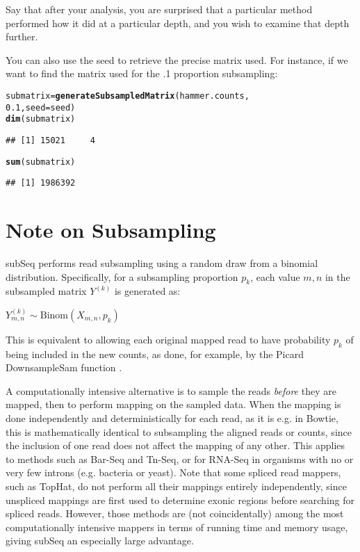 \documentclass{article}\usepackage[]{graphicx}\usepackage[]{color}
\makeatletter
\newcommand{\hlnum}[1]{\textcolor[rgb]{0.686,0.059,0.569}{#1}}%
\newcommand{\hlstd}[1]{\textcolor[rgb]{0.345,0.345,0.345}{#1}}%
\newcommand{\hlkwb}[1]{\textcolor[rgb]{0.69,0.353,0.396}{#1}}%
\newcommand{\hlkwc}[1]{\textcolor[rgb]{0.333,0.667,0.333}{#1}}%
\newcommand{\hlkwd}[1]{\textcolor[rgb]{0.737,0.353,0.396}{\textbf{#1}}}%
\newenvironment{kframe}{%
 \def\at@end@of@kframe{}%
 \ifinner\ifhmode%
  \def\at@end@of@kframe{\end{minipage}}%
  \begin{minipage}{\columnwidth}%
 \fi\fi%
 \def\FrameCommand##1{\hskip\@totalleftmargin \hskip-\fboxsep
 \colorbox{shadecolor}{##1}\hskip-\fboxsep
     \hskip-\linewidth \hskip-\@totalleftmargin \hskip\columnwidth}%
 \MakeFramed {\advance\hsize-\width
   \@totalleftmargin\z@ \linewidth\hsize
   \@setminipage}}%
 {\par\unskip\endMakeFramed%
 \at@end@of@kframe}
\newenvironment{knitrout}{}{} %
\makeatother
\begin{document}
Say that after your analysis, you are surprised that a particular method performed how it did at a particular depth, and you wish to examine that depth further.

You can also use the seed to retrieve the precise matrix used. For instance, if we want to find the matrix used for the .1 proportion subsampling:

\begin{knitrout}
\color{fgcolor}\begin{kframe}
\begin{alltt}
\hlstd{submatrix} \hlkwb{=} \hlkwd{generateSubsampledMatrix}\hlstd{(hammer.counts,}
    \hlnum{0.1}\hlstd{,} \hlkwc{seed} \hlstd{= seed)}
\hlkwd{dim}\hlstd{(submatrix)}
\end{alltt}
\begin{verbatim}
## [1] 15021     4
\end{verbatim}
\begin{alltt}
\hlkwd{sum}\hlstd{(submatrix)}
\end{alltt}
\begin{verbatim}
## [1] 1986392
\end{verbatim}
\end{kframe}
\end{knitrout}

\section{Note on Subsampling}

subSeq performs read subsampling using a random draw from a binomial distribution. Specifically, for a subsampling proportion $p_k$, each value $m,n$ in the subsampled matrix $Y^{(k)}$ is generated as:

\begin{center}
$Y^{(k)}_{m,n} \sim \mbox{Binom}(X_{m,n}, p_k)$
\end{center}

This is equivalent to allowing each original mapped read to have probability $p_k$ of being included in the new counts, as done, for example, by the Picard DownsampleSam function \citep{Picard}.

A computationally intensive alternative is to sample the reads \emph{before} they are mapped, then to perform mapping on the sampled data. When the mapping is done independently and deterministically for each read, as it is e.g. in Bowtie, this is mathematically identical to subsampling the aligned reads or counts, since the inclusion of one read does not affect the mapping of any other. This applies to methods such as Bar-Seq and Tn-Seq, or for RNA-Seq in organisms with no or very few introns (e.g. bacteria or yeast). Note that some spliced read mappers, such as TopHat, do not perform all their mappings entirely independently, since unspliced mappings are first used to determine exonic regions before searching for spliced reads. However, those methods are (not coincidentally) among the most computationally intensive mappers in terms of running time and memory usage, giving subSeq an especially large advantage.
\end{document}
